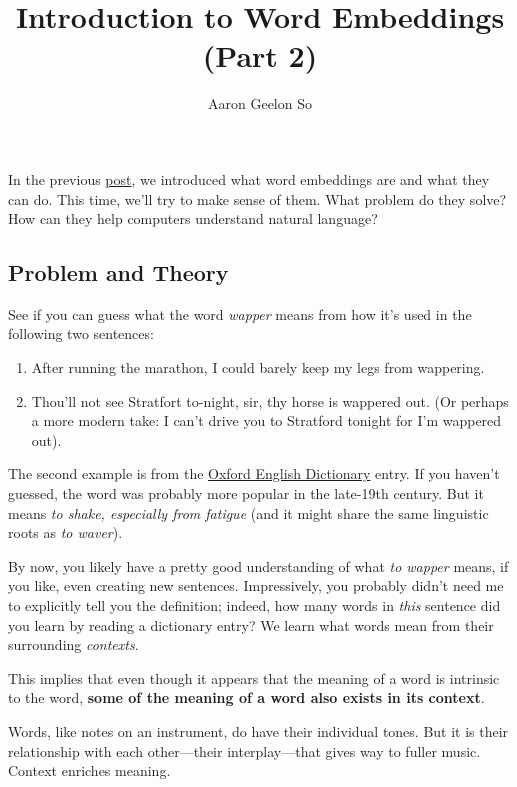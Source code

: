 \documentclass[11pt]{article}
\title{Introduction to Word Embeddings (Part 2)}
\author{Aaron Geelon So}
\date{}
\begin{document}
\maketitle


In the previous \href{2017-07-24-word-embeddings-1.html}{post}, we
introduced what word embeddings are and what they can do. This time,
we'll try to make sense of them. What problem do they solve? How can
they help computers understand natural language?

\subsection*{Problem and Theory}\label{problem-and-theory}

See if you can guess what the word \emph{wapper} means from how it's
used in the following two sentences:

\begin{enumerate}
\def\labelenumi{\arabic{enumi}.}
\item
  After running the marathon, I could barely keep my legs from
  wappering.
\item
  Thou'll not see Stratfort to-night, sir, thy horse is wappered out.
  (Or perhaps a more modern take: I can't drive you to Stratford tonight
  for I'm wappered out).
\end{enumerate}

The second example is from the
\href{http://www.oed.com/view/Entry/225584}{Oxford English Dictionary}
entry. If you haven't guessed, the word was probably more popular in the
late-19th century. But it means \emph{to shake, especially from fatigue}
(and it might share the same linguistic roots as \emph{to waver}).

By now, you likely have a pretty good understanding of what \emph{to
wapper} means, if you like, even creating new sentences. Impressively,
you probably didn't need me to explicitly tell you the definition;
indeed, how many words in \emph{this} sentence did you learn by reading
a dictionary entry? We learn what words mean from their surrounding
\emph{contexts}.

This implies that even though it appears that the meaning of a word is
intrinsic to the word, \textbf{some of the meaning of a word also exists
in its context}.

Words, like notes on an instrument, do have their individual tones. But
it is their relationship with each other---their interplay---that gives
way to fuller music. Context enriches meaning.
\end{document}
